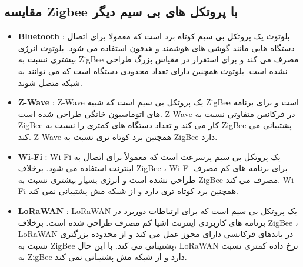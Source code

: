 \subsection{مقایسه Zigbee با پروتکل های بی سیم دیگر}


\begin{itemize}

    \item 
    {
        \textbf{Bluetooth} :
        بلوتوث یک پروتکل بی سیم کوتاه برد است که معمولا برای اتصال دستگاه هایی مانند گوشی های هوشمند و هدفون استفاده می شود. بلوتوث انرژی بیشتری نسبت به ZigBee مصرف می کند و برای استقرار در مقیاس بزرگ طراحی نشده است. بلوتوث همچنین دارای تعداد محدودی دستگاه است که می توانند به شبکه متصل شوند.
    }
    \item 
    {
        \textbf{Z-Wave} :
        Z-Wave یک پروتکل بی سیم است که شبیه ZigBee است و برای برنامه های اتوماسیون خانگی طراحی شده است. Z-Wave در فرکانس متفاوتی نسبت به ZigBee کار می کند و تعداد دستگاه های کمتری را نسبت به ZigBee پشتیبانی می کند. Z-Wave همچنین برد کوتاه تری نسبت به ZigBee دارد.
    }
    \item 
    {
        \textbf{Wi-Fi} :
        Wi-Fi یک پروتکل بی سیم پرسرعت است که معمولاً برای اتصال به اینترنت استفاده می شود. 
        برخلاف ZigBee
        ،
        Wi-Fi برای برنامه های کم مصرف طراحی نشده است و انرژی بسیار بیشتری نسبت به ZigBee مصرف می کند. Wi-Fi همچنین برد کوتاه تری دارد و از شبکه مش پشتیبانی نمی کند.
    }
    \item 
    {
        \textbf{LoRaWAN} :
        LoRaWAN یک پروتکل بی سیم است که برای ارتباطات دوربرد در برنامه های کاربردی اینترنت اشیا کم مصرف طراحی شده است. 
        برخلاف ZigBee
        ،
        LoRaWAN در باندهای فرکانسی دارای مجوز عمل می کند و از محدوده بزرگتری نسبت به ZigBee پشتیبانی می کند. با این حال، LoRaWAN نرخ داده کمتری نسبت به ZigBee دارد و از شبکه مش پشتیبانی نمی کند.
    }   

\end{itemize}

        
